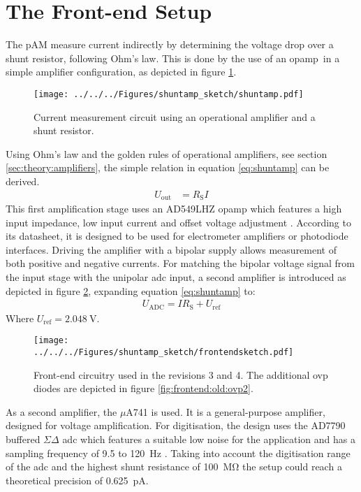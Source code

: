 \section{The Front-end Setup}
The \ac{pAM} measure current indirectly by determining the voltage drop over a shunt resistor, following Ohm's law. This is done by the use of an \ac{opamp}\ in a simple amplifier configuration, as depicted in figure \ref{fig:shuntamp}.
\begin{figure}
	\centering
	\texttt{[image: ../../../Figures/shuntamp\_sketch/shuntamp.pdf]}
	\caption{Current measurement circuit using an operational amplifier and a shunt resistor.}
	\label{fig:shuntamp}
\end{figure}
Using Ohm's law and the golden rules of operational amplifiers, see section \ref{sec:theory:amplifiers}, the simple relation in equation \ref{eq:shuntamp} can be derived.
\begin{align}
	U_\text{out} & = R_\text{S}I\label{eq:shuntamp}
\end{align}
This first amplification stage uses an AD549LHZ \ac{opamp} which features a high input impedance, low input current and offset voltage adjustment \cite{AD549}. According to its datasheet, it is designed to be used for electrometer amplifiers or photodiode interfaces. Driving the amplifier with a bipolar supply allows measurement of both positive and negative currents. For matching the bipolar voltage signal from the input stage with the unipolar \ac{adc} input, a second amplifier is introduced as depicted in figure \ref{fig:frontendsketch}, expanding equation \ref{eq:shuntamp} to:
\begin{align}
	U_\text{ADC}=IR_\text{S}+U_\text{ref}
	\label{eq:frontend:old:transferfunction1}
\end{align}
Where $U_\text{ref}=\SI{2.048}{\volt}$.
\begin{figure}
	\centering
	\texttt{[image: ../../../Figures/shuntamp\_sketch/frontendsketch.pdf]}
	\caption{Front-end circuitry used in the revisions 3 and 4. The additional \ac{ovp} diodes are depicted in figure \ref{fig:frontend:old:ovp2}.}
	\label{fig:frontendsketch}
\end{figure}
As a second amplifier, the $\mu$A741 is used. It is a general-purpose amplifier, designed for voltage amplification.
For digitisation, the design uses the AD7790 buffered $\Sigma\Delta$ \ac{adc} which features a suitable low noise for the application and has a sampling frequency of \SI{9.5}{} to \SI{120}{\hertz} \cite{AD7790}. Taking into account the digitisation range of the \ac{adc} and the highest shunt resistance of \SI{100}{\mega\ohm} the setup could reach a theoretical precision of \SI{0.625}{\pico\ampere}. 

